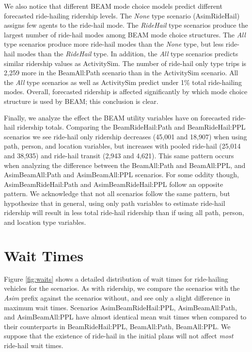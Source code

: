 \documentclass[simple, masters, twoside]{byuthesis}
\begin{document}
We also notice that different BEAM mode choice models predict different forecasted ride-hailing ridership levels. The \emph{None} type scenario (AsimRideHail) assigns few agents to the ride-hail mode. The \emph{RideHail} type scenarios produce the largest number of ride-hail modes among BEAM mode choice structures. The \emph{All} type scenarios produce more ride-hail modes than the \emph{None} type, but less ride-hail modes than the \emph{RideHail} type. In addition, the \emph{All} type scenarios predicts similar ridership values as ActivitySim. The number of ride-hail only type trips is 2,259 more in the BeamAll:Path scenario than in the ActivitySim scenario. All the \emph{All} type scenarios as well as ActivitySim predict under 1\% total ride-hailing modes. Overall, forecasted ridership is affected significantly by which mode choice structure is used by BEAM; this conclusion is clear.

Finally, we analyze the effect the BEAM utility variables have on forecasted ride-hail ridership totals. Comparing the BeamRideHail:Path and BeamRideHail:PPL scenarios we see ride-hail only ridership decreases (45,001 and 18,907) when using path, person, and location variables, but increases with pooled ride-hail (25,014 and 38,935) and ride-hail transit (2,943 and 4,621). This same pattern occurs when analyzing the difference between the BeamAll:Path and BeamAll:PPL, and AsimBeamAll:Path and AsimBeamAll:PPL scenarios. For some oddity though, AsimBeamRideHail:Path and AsimBeamRideHail:PPL follow an opposite pattern. We acknowledge that not all scenarios follow the same pattern, but hypothesize that in general, using only path variables to estimate ride-hail ridership will result in less total ride-hail ridership than if using all path, person, and location type variables.

\hypertarget{res-waits}{%
\section{Wait Times}\label{res-waits}}

Figure \ref{fig:waits} shows a detailed distribution of wait times for ride-hailing vehicles for the scenarios. As with ridership, we compare the scenarios with the \emph{Asim} prefix against the scenarios without, and see only a slight difference in maximum wait times. Scenarios AsimBeamRideHail:PPL, AsimBeamAll:Path, and AsimBeamAll:PPL have almost identical mean wait times when compared to their counterparts in BeamRideHail:PPL, BeamAll:Path, BeamAll:PPL. We suppose that the existence of ride-hail in the initial plans will not affect \emph{most} ride-hail wait times.
\end{document}

